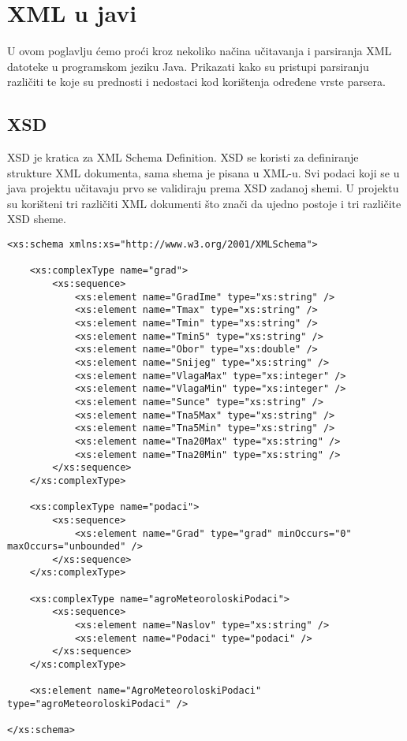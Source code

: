 \documentclass[]{foi}
\begin{document}
\chapter{XML u javi}
U ovom poglavlju ćemo proći kroz nekoliko načina učitavanja i parsiranja XML datoteke
u programskom jeziku Java. Prikazati kako su pristupi parsiranju različiti te koje su
prednosti i nedostaci kod korištenja određene vrste parsera.

\section{XSD}
XSD je kratica za XML Schema Definition. XSD se koristi za definiranje strukture XML
dokumenta, sama shema je pisana u XML-u.
Svi podaci koji se u java projektu učitavaju prvo se validiraju prema XSD zadanoj shemi.
U projektu su korišteni tri različiti XML dokumenti što znači da ujedno postoje i
tri različite XSD sheme.

\begin{lstlisting}[caption={Primjer XSD dokumenta za sedmodnevnu prognozu vremena}]
<xs:schema xmlns:xs="http://www.w3.org/2001/XMLSchema">

    <xs:complexType name="grad">
        <xs:sequence>
            <xs:element name="GradIme" type="xs:string" />
            <xs:element name="Tmax" type="xs:string" />
            <xs:element name="Tmin" type="xs:string" />
            <xs:element name="Tmin5" type="xs:string" />
            <xs:element name="Obor" type="xs:double" />
            <xs:element name="Snijeg" type="xs:string" />
            <xs:element name="VlagaMax" type="xs:integer" />
            <xs:element name="VlagaMin" type="xs:integer" />
            <xs:element name="Sunce" type="xs:string" />
            <xs:element name="Tna5Max" type="xs:string" />
            <xs:element name="Tna5Min" type="xs:string" />
            <xs:element name="Tna20Max" type="xs:string" />
            <xs:element name="Tna20Min" type="xs:string" />
        </xs:sequence>
    </xs:complexType>

    <xs:complexType name="podaci">
        <xs:sequence>
            <xs:element name="Grad" type="grad" minOccurs="0" maxOccurs="unbounded" />
        </xs:sequence>
    </xs:complexType>

    <xs:complexType name="agroMeteoroloskiPodaci">
        <xs:sequence>
            <xs:element name="Naslov" type="xs:string" />
            <xs:element name="Podaci" type="podaci" />
        </xs:sequence>
    </xs:complexType>

    <xs:element name="AgroMeteoroloskiPodaci" type="agroMeteoroloskiPodaci" />

</xs:schema>
\end{lstlisting}
\end{document}
